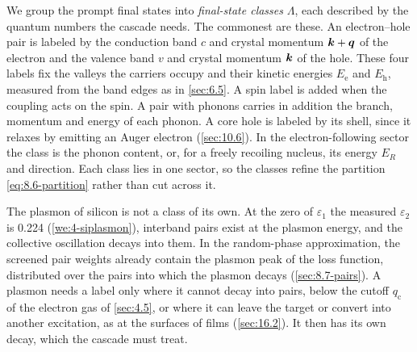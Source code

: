 We group the prompt final states into \emph{final-state classes} $\Lambda$, each described by the quantum numbers the cascade needs. The commonest are these.
An electron--hole pair is labeled by the conduction band $c$ and crystal momentum $\bm{k}+\bm{q}$ of the electron and the valence band $v$ and crystal momentum $\bm{k}$ of the hole. These four labels fix the valleys the carriers occupy and their kinetic energies $E_{\mathrm{e}}$ and $E_{\mathrm{h}}$, measured from the band edges as in \cref{sec:6.5}. A spin label is added when the coupling acts on the spin. A pair with phonons carries in addition the branch, momentum and energy of each phonon. A core hole is labeled by its shell, since it relaxes by emitting an Auger electron (\cref{sec:10.6}). In the electron-following sector the class is the phonon content, or, for a freely recoiling nucleus, its energy $E_R$ and direction. Each class lies in one sector, so the classes refine the partition \cref{eq:8.6-partition} rather than cut across it.

The plasmon of silicon is not a class of its own. At the zero of $\varepsilon_1$ the measured $\varepsilon_2$ is 0.224 (\cref{we:4-siplasmon}), interband pairs exist at the plasmon energy, and the collective oscillation decays into them. In the random-phase approximation, the screened pair weights already contain the plasmon peak of the loss function, distributed over the pairs into which the plasmon decays (\cref{sec:8.7-pairs}). A plasmon needs a label only where it cannot decay into pairs, below the cutoff $q_{\mathrm{c}}$ of the electron gas of \cref{sec:4.5}, or where it can leave the target or convert into another excitation, as at the surfaces of films (\cref{sec:16.2}). It then has its own decay, which the cascade must treat.

